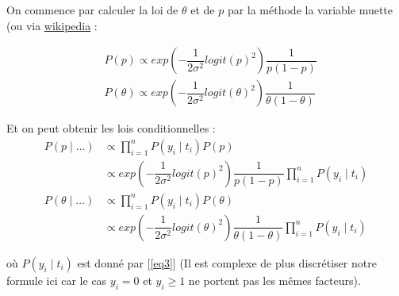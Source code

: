 \begin{center}
\end{center}

On commence par calculer la loi de $\theta$ et de $p$ par la méthode la variable muette (ou via \href{https://en.wikipedia.org/wiki/Logit-normal_distribution}{wikipedia} :

\begin{equation}\label{eq4}
    \begin{split}
        &P(p) \propto exp \left (-\dfrac{1}{2 \sigma^2}logit(p)^2 \right) \dfrac{1}{p (1-p)} \\
        &P(\theta) \propto exp \left (-\dfrac{1}{2 \sigma^2}logit(\theta)^2 \right) \dfrac{1}{\theta (1-\theta)}
    \end{split}
\end{equation}

Et on peut obtenir les lois conditionnelles : 
\begin{equation}\label{eq5}
\begin{split}
    P(p\mid \dots) &\propto \prod_{i=1}^n P(y_i \mid t_i) P(p)\\
    &\propto exp \left (-\dfrac{1}{2 \sigma^2}logit(p)^2 \right) \dfrac{1}{p (1-p)} \prod_{i=1}^n P(y_i \mid t_i) \\
    P(\theta \mid \dots) &\propto \prod_{i=1}^n P(y_i \mid t_i) P(\theta) \\
    &\propto exp \left (-\dfrac{1}{2 \sigma^2}logit(\theta)^2 \right) \dfrac{1}{\theta (1-\theta)} \prod_{i=1}^n P(y_i \mid t_i)
\end{split}
\end{equation}

où $P(y_i \mid t_i)$ est donné par [\ref{eq3}] (Il est complexe de plus discrétiser notre formule ici car le cas $y_i = 0$ et $y_i \geq 1$ ne portent pas les mêmes facteurs).